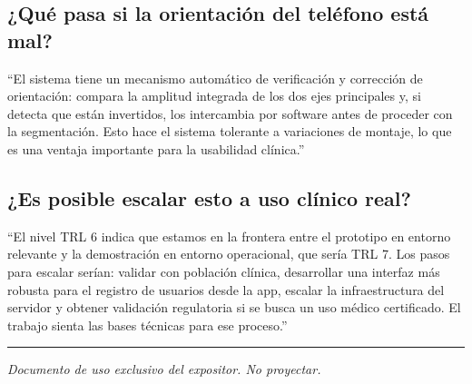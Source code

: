 \documentclass[12pt]{article}
\begin{document}
\subsection*{¿Qué pasa si la orientación del teléfono está mal?}

``El sistema tiene un mecanismo automático de verificación y corrección de orientación: compara la amplitud integrada de los dos ejes principales y, si detecta que están invertidos, los intercambia por software antes de proceder con la segmentación. Esto hace el sistema tolerante a variaciones de montaje, lo que es una ventaja importante para la usabilidad clínica.''

\subsection*{¿Es posible escalar esto a uso clínico real?}

``El nivel TRL 6 indica que estamos en la frontera entre el prototipo en entorno relevante y la demostración en entorno operacional, que sería TRL 7. Los pasos para escalar serían: validar con población clínica, desarrollar una interfaz más robusta para el registro de usuarios desde la app, escalar la infraestructura del servidor y obtener validación regulatoria si se busca un uso médico certificado. El trabajo sienta las bases técnicas para ese proceso.''

\vspace{1em}\hrule\vspace{0.5em}
\begin{center}
  {\small \textit{Documento de uso exclusivo del expositor. No proyectar.}}
\end{center}
\end{document}
